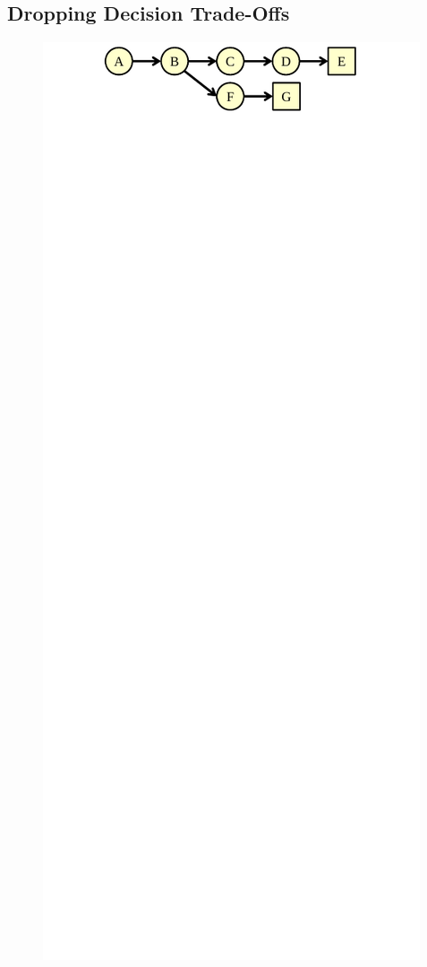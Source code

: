 \subsection{Dropping Decision Trade-Offs}
\label{sec:policies.events}

\begin{figure}
  \begin{center}
    \includegraphics[width=\columnwidth]{figs/dataflow_graph.pdf}

\end{center}
\end{figure}
